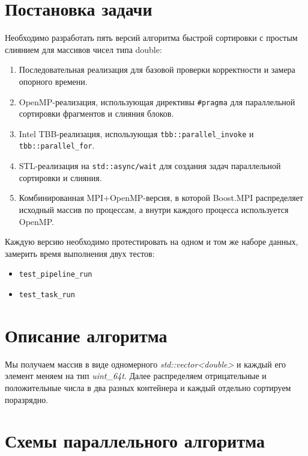 \documentclass[a4paper,12pt]{article}
\begin{document}
\section{Постановка задачи}
\hspace*{1.25em}Необходимо разработать пять версий алгоритма быстрой сортировки с простым слиянием для массивов чисел типа double:
\begin{enumerate}
    \item Последовательная реализация для базовой проверки корректности и замера опорного времени.
    \item OpenMP-реализация, использующая директивы \texttt{\#pragma} для параллельной сортировки фрагментов и слияния блоков.
    \item Intel TBB-реализация, использующая \texttt{tbb::parallel\_invoke} и \texttt{tbb::parallel\_for}.
    \item STL-реализация на \texttt{std::async/wait} для создания задач параллельной сортировки и слияния.
    \item Комбинированная MPI+OpenMP-версия, в которой Boost.MPI распределяет исходный массив по процессам, а внутри каждого процесса используется OpenMP.
\end{enumerate}

\hspace*{1.25em}Каждую версию необходимо протестировать на одном и том же наборе данных, замерить время выполнения двух тестов:
\begin{itemize}
    \item \texttt{test\_pipeline\_run}
    \item \texttt{test\_task\_run}
\end{itemize}
\newpage


\section{Описание алгоритма}
Мы получаем массив в виде одномерного \textit{std::vector<double>} и каждый его элемент меняем на тип \textit{\normalsize uint\_64t}. Далее распределяем отрицательные и положительные числа в два разных контейнера и каждый отдельно сортируем поразрядно.
\newpage


\section{Схемы параллельного алгоритма}
\end{document}

